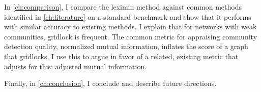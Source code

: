 In \autoref{ch:comparison}, I compare the leximin method against common methods identified in \autoref{ch:literature} on a standard benchmark and show that it performs with similar accuracy to existing methods. I explain that for networks with weak communities, gridlock is frequent. The common metric for appraising community detection quality, normalized mutual information, inflates the score of a graph that gridlocks. I use this to argue in favor of a related, existing metric that adjusts for this: adjusted mutual information.

Finally, in \autoref{ch:conclusion}, I conclude and describe future directions.

%
%
%
%
%
%
%
%
%

%
%
%
%
%
%
